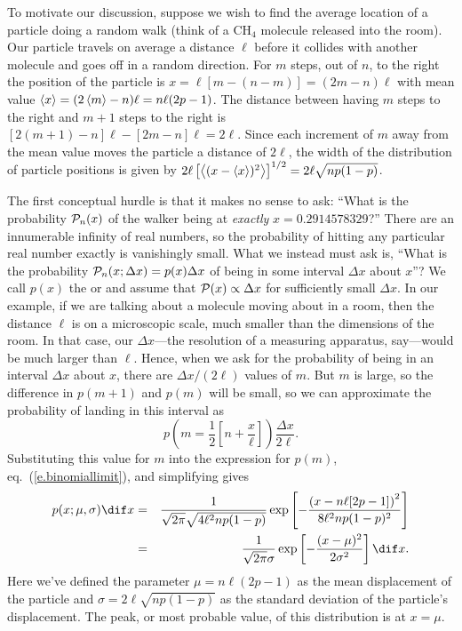 To motivate our discussion, suppose we wish to find the average location of a particle doing a random walk (think of a $\mathrm{CH_{4}}$ molecule released into the room). Our particle travels on average a distance $\ell$ before it collides with another molecule and goes off in a random direction.
For $m$ steps, out of $n$, to the right the position of the particle is $x = \ell[m - (n-m)] = (2m-n)\ell$ with mean value $\left\langle x\right\rangle = (2\left\langle m\right\rangle-n)\ell = n\ell(2p-1)$. The distance between having $m$ steps to the right and $m+1$ steps to the right is $[2(m+1)-n]\ell - [2m-n]\ell = 2\ell$. Since each increment of $m$ away from the mean value moves the particle a distance of $2\ell$, the width of the distribution of particle positions is given by $2\ell\left[\left\langle(x-\left\langle x\right\rangle)^{2}\right\rangle\right]^{1/2} = 2\ell\sqrt{np(1-p)}$.

The first conceptual hurdle is that it makes no sense to ask: ``What is the probability $\mathcal{P}_{n}(x)$ of the walker being at \emph{exactly} $x=0.2914578329$?'' There are an innumerable infinity of real numbers, so the probability of hitting any particular real number exactly is vanishingly small.  What we instead must ask is, ``What is the probability $\mathcal{P}_{n}(x;\Delta x) = p(x)\Delta x$ of being in some interval $\Delta x$ about $x$''?  We call $p(x)$ the  or  and assume that $\mathcal{P}(x) \propto \Delta x$ for sufficiently small $\Delta x$. In our example, if we are talking about a molecule moving about in a room, then the distance $\ell$ is on a microscopic scale, much smaller than the dimensions of the room. In that case, our $\Delta x$---the resolution of a measuring apparatus, say---would be much larger than $\ell$. Hence, when we ask for the probability of being in an interval $\Delta x$ about $x$, there are $\Delta x/(2\ell)$ values of $m$. But $m$ is large, so the difference in $p(m+1)$ and $p(m)$ will be small, so we can approximate the probability of landing in this interval as
\[
	p\left(m=\frac{1}{2}\left[n+\frac{x}{\ell}\right]\right) \frac{\Delta x}{2\ell}.
\]
Substituting this value for $m$ into the expression for $p(m)$, eq.~(\ref{e.binomiallimit}), and simplifying gives
\begin{eqnarray}
	p(x;\mu,\sigma)\dif x &=& \frac{1}{\sqrt{2\pi}\sqrt{4\ell^{2}np(1-p)}}
		\exp\left[-\frac{\left(x - n\ell[2p-1]\right)^{2}}{8\ell^{2}np(1-p)^{2}}\right]\nonumber \\
		&=& \frac{1}{\sqrt{2\pi}\sigma}\exp\left[-\frac{(x-\mu)^{2}}{2\sigma^{2}}\right]\dif x.
\label{e.gaussian}
\end{eqnarray}
Here we've defined the parameter $\mu = n\ell(2p-1)$ as the mean displacement of the particle and $\sigma = 2\ell\sqrt{np(1-p)}$ as the standard deviation of the particle's displacement. The peak, or most probable value, of this distribution is at $x=\mu$.

